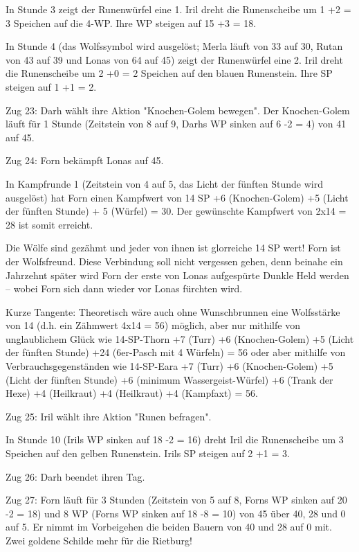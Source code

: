 \documentclass[10pt, a4paper, oneside]{book}
\begin{document}
{In Stunde 3 zeigt der Runenwürfel eine 1. Iril dreht die Runenscheibe um 1 +2 = 3 Speichen auf die 4-WP. Ihre WP steigen auf 15 +3 = 18.

In Stunde 4 (das Wolfssymbol wird ausgelöst; Merla läuft von 33 auf 30, Rutan von 43 auf 39 und Lonas von 64 auf 45) zeigt der Runenwürfel eine 2. Iril dreht die Runenscheibe um 2 +0 = 2 Speichen auf den blauen Runenstein. Ihre SP steigen auf 1 +1 = 2.



Zug 23: Darh wählt ihre Aktion "Knochen-Golem bewegen". Der Knochen-Golem läuft für 1 Stunde (Zeitstein von 8 auf 9, Darhs WP sinken auf 6 -2 = 4) von 41 auf 45.



Zug 24: Forn bekämpft Lonas auf 45.

In Kampfrunde 1 (Zeitstein von 4 auf 5, das Licht der fünften Stunde wird ausgelöst) hat Forn einen Kampfwert von 14 SP +6 (Knochen-Golem) +5 (Licht der fünften Stunde) + 5 (Würfel) = 30. Der gewünschte Kampfwert von 2x14 = 28 ist somit erreicht.

Die Wölfe sind gezähmt und jeder von ihnen ist glorreiche 14 SP wert! Forn ist der Wolfsfreund. Diese Verbindung soll nicht vergessen gehen, denn beinahe ein Jahrzehnt später wird Forn der erste von Lonas aufgespürte Dunkle Held werden – wobei Forn sich dann wieder vor Lonas fürchten wird.



Kurze Tangente: Theoretisch wäre auch ohne Wunschbrunnen eine Wolfsstärke von 14 (d.h. ein Zähmwert 4x14 = 56) möglich, aber nur mithilfe von unglaublichem Glück wie 14-SP-Thorn +7 (Turr) +6 (Knochen-Golem) +5 (Licht der fünften Stunde) +24 (6er-Pasch mit 4 Würfeln) = 56 oder aber mithilfe von Verbrauchsgegenständen wie 14-SP-Eara +7 (Turr) +6 (Knochen-Golem) +5 (Licht der fünften Stunde) +6 (minimum Wassergeist-Würfel) +6 (Trank der Hexe) +4 (Heilkraut) +4 (Heilkraut) +4 (Kampfaxt) = 56.



Zug 25: Iril wählt ihre Aktion "Runen befragen".

In Stunde 10 (Irils WP sinken auf 18 -2 = 16) dreht Iril die Runenscheibe um 3 Speichen auf den gelben Runenstein. Irils SP steigen auf 2 +1 = 3.



Zug 26: Darh beendet ihren Tag.



Zug 27: Forn läuft für 3 Stunden (Zeitstein von 5 auf 8, Forns WP sinken auf 20 -2 = 18) und 8 WP (Forns WP sinken auf 18 -8 = 10) von 45 über 40, 28 und 0 auf 5. Er nimmt im Vorbeigehen die beiden Bauern von 40 und 28 auf 0 mit. Zwei goldene Schilde mehr für die Rietburg!

}
\end{document}
